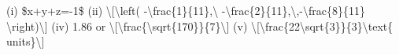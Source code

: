 \item 
\item (i) \$x+y+z=-1\$ (ii) \textbackslash{[}\textbackslash left( -\textbackslash frac\{1\}\{11\},\textbackslash{}
-\textbackslash frac\{2\}\{11\},\textbackslash ,-\textbackslash frac\{8\}\{11\}
\textbackslash right)\textbackslash{]} (iv) 1.86 or \textbackslash{[}\textbackslash frac\{\textbackslash sqrt\{170\}\}\{7\}\textbackslash{]}
(v) \textbackslash{[}\textbackslash frac\{22\textbackslash sqrt\{3\}\}\{3\}\textbackslash text\{
units\}\textbackslash{]}